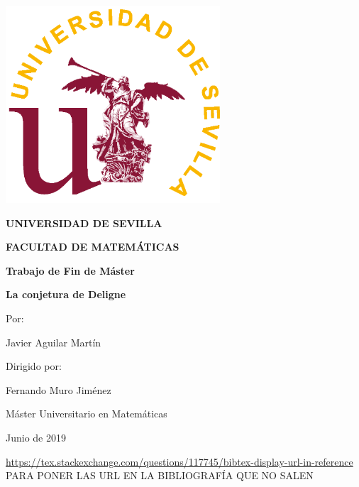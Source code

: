\documentclass[twoside,11pt]{report}
\begin{document}
\begin{titlepage}
	\centering
		\includegraphics[width=8cm]{Imagenes/sello.png}
		
	{\Large\bfseries UNIVERSIDAD DE SEVILLA\par}
	{\Large\bfseries FACULTAD DE MATEMÁTICAS\par}
	\vspace{0.5cm}
	{\large\bfseries Trabajo de Fin de Máster \par}
	\vspace{1cm}
	{\Huge\bfseries La conjetura de Deligne\par}
	\vspace{1cm}
	{\large Por:\par}
	{\large Javier Aguilar Martín\par}
	\vspace{0.5cm}
	{\large Dirigido por:\par}
	{\large Fernando Muro Jiménez\par}
	\vspace{1cm}
	{\large Máster Universitario en Matemáticas\par}
	\vspace{0.5cm}
	{\large  Junio de 2019\par}
	\vspace{1cm}





	
\end{titlepage}



\tableofcontents

\url{https://tex.stackexchange.com/questions/117745/bibtex-display-url-in-reference} PARA PONER LAS URL EN LA BIBLIOGRAFÍA QUE NO SALEN

\end{document}
